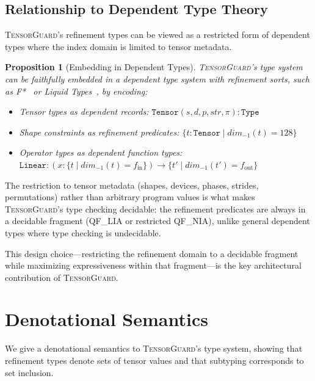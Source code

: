 \documentclass[10pt]{article}
\newcommand{\tguard}{\textsc{TensorGuard}}
\theoremstyle{plain}
\newtheorem{proposition}[theorem]{Proposition}
\theoremstyle{definition}
\theoremstyle{remark}
\begin{document}
\subsection{Relationship to Dependent Type Theory}

\tguard{}'s refinement types can be viewed as a restricted form of
dependent types where the index domain is limited to tensor metadata.

\begin{proposition}[Embedding in Dependent Types]
\tguard{}'s type system can be faithfully embedded in a dependent
type system with refinement sorts, such as F*~\cite{fstar} or
Liquid Types~\cite{flanagan06}, by encoding:
\begin{itemize}[nosep]
  \item Tensor types as dependent records:
    $\texttt{Tensor}(s, d, p, \mathit{str}, \pi) : \texttt{Type}$
  \item Shape constraints as refinement predicates:
    $\{t : \texttt{Tensor} \mid \mathit{dim}_{-1}(t) = 128\}$
  \item Operator types as dependent function types:
    $\texttt{Linear} : (x : \{t \mid \mathit{dim}_{-1}(t) = f_\text{in}\})
    \to \{t' \mid \mathit{dim}_{-1}(t') = f_\text{out}\}$
\end{itemize}
\end{proposition}

The restriction to tensor metadata (shapes, devices, phases, strides,
permutations) rather than arbitrary program values is what makes
\tguard{}'s type checking decidable: the refinement predicates are
always in a decidable fragment (QF\_LIA or restricted QF\_NIA),
unlike general dependent types where type checking is undecidable.

This design choice---restricting the refinement domain to a decidable
fragment while maximizing expressiveness within that fragment---is
the key architectural contribution of \tguard{}.


\section{Denotational Semantics}\label{sec:denotational}

We give a denotational semantics to \tguard{}'s type system, showing
that refinement types denote sets of tensor values and that subtyping
corresponds to set inclusion.
\end{document}
